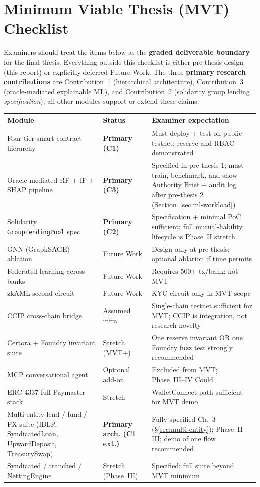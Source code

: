 \documentclass[12pt, a4paper]{report}
\newcommand{\tableheadcolor}{\rowcolor{TableHeadBg}}
\begin{document}
\section{Minimum Viable Thesis (MVT) Checklist}
\label{sec:mvt-checklist}

Examiners should treat the items below as the \textbf{graded deliverable boundary} for the final thesis. Everything outside this checklist is either pre-thesis design (this report) or explicitly deferred Future Work. The three \textbf{primary research contributions} are Contribution~1 (hierarchical architecture), Contribution~3 (oracle-mediated explainable ML), and Contribution~2 (solidarity group lending \textit{specification}); all other modules support or extend these claims.

\begin{table}[H]
\centering
\begin{tabular}{p{4.2cm}p{2.2cm}p{7.8cm}}
\toprule
\tableheadcolor
\textbf{Module} & \textbf{Status} & \textbf{Examiner expectation} \\
\midrule
Four-tier smart-contract hierarchy & \textbf{Primary (C1)} & Must deploy + test on public testnet; reserve and RBAC demonstrated \\
Oracle-mediated RF + IF + SHAP pipeline & \textbf{Primary (C3)} & Specified in pre-thesis 1; must train, benchmark, and show Authority Brief + audit log after pre-thesis 2 (Section~\ref{sec:ml-workload}) \\
Solidarity \texttt{GroupLendingPool} spec & \textbf{Primary (C2)} & Specification + minimal PoC sufficient; full mutual-liability lifecycle is Phase~II stretch \\
GNN (GraphSAGE) ablation & Future Work & Design only at pre-thesis; optional ablation if time permits \\
Federated learning across banks & Future Work & Requires 500+ tx/bank; not MVT \\
zkAML second circuit & Future Work & KYC circuit only in MVT scope \\
CCIP cross-chain bridge & Assumed infra & Single-chain testnet sufficient for MVT; CCIP is integration, not research novelty \\
Certora + Foundry invariant suite & Stretch (MVT+) & One reserve invariant OR one Foundry fuzz test strongly recommended \\
MCP conversational agent & Optional add-on & Excluded from MVT; Phase~III--IV Could \\
ERC-4337 full Paymaster stack & Stretch & WalletConnect path sufficient for MVT demo \\
Multi-entity lend / fund / FX suite (IBLP, SyndicatedLoan, UpwardDeposit, TreasurySwap) & \textbf{Primary arch. (C1 ext.)} & Fully specified Ch.~3 (\S\ref{sec:multi-entity}); Phase~II--III; demo of one flow recommended \\
Syndicated / tranched / NettingEngine & Stretch (Phase~III) & Specified; full suite beyond MVT minimum \\
\bottomrule
\end{tabular}
\end{table}
\end{document}

